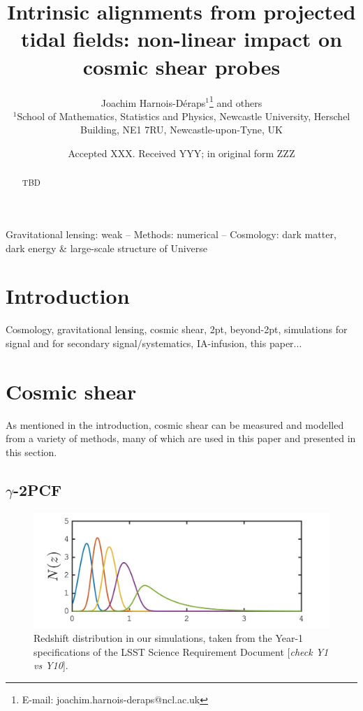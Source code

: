 \documentclass[useAMS,usenatbib]{mn2e}
\title[Lensing beyond 2pt: accounting for IA]{Intrinsic alignments from projected tidal fields: non-linear  impact on cosmic shear probes}
\author[J. Harnois-D\'{e}raps et al.]{Joachim Harnois-D\'{e}raps$^{1}$\thanks{E-mail: joachim.harnois-deraps@ncl.ac.uk} and others
\\
$^{1}$School of Mathematics, Statistics and Physics, Newcastle University, Herschel Building, NE1 7RU, Newcastle-upon-Tyne, UK\\
}
\date{Accepted XXX. Received YYY; in original form ZZZ}
\begin{document}
\label{firstpage}
\maketitle

\begin{abstract}
TBD
\end{abstract}

\begin{keywords}
Gravitational lensing: weak -- Methods: numerical -- Cosmology: dark matter, dark energy \& large-scale structure of Universe 
\end{keywords}



  
\section{Introduction}
\label{sec:intro}

Cosmology, gravitational lensing, cosmic shear, 2pt, beyond-2pt, simulations for signal and for secondary signal/systematics, IA-infusion, this paper... 

\section{Cosmic shear}
\label{sec:theory}

As mentioned in the introduction, cosmic shear can be measured and modelled from a variety of methods, many of which are used in this paper and presented in this section.  
\subsection{$\gamma$-2PCF}
\label{subsec:wl-th}


\begin{figure}
\includegraphics[width=\columnwidth]{graphs/Nz}
\caption{Redshift distribution in our simulations, taken from the Year-1 specifications of the LSST Science Requirement Document \citep{LSST-SRD} {[\it check Y1 vs Y10}].}
\label{fig:Nz}
\end{figure}
\end{document}
